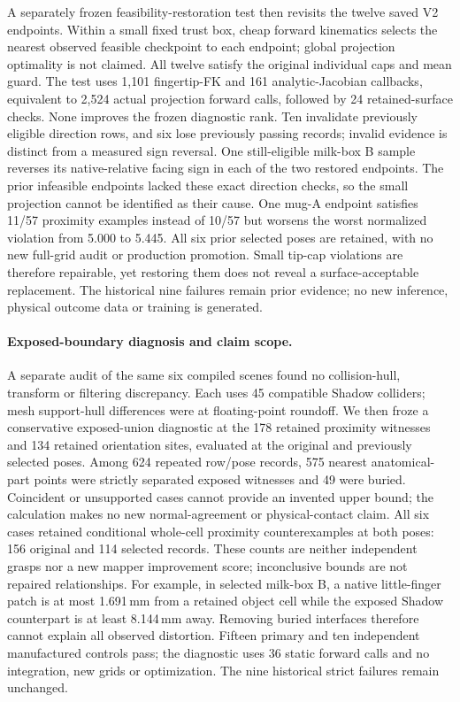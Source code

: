 \documentclass[10pt,letterpaper]{article}
\begin{document}
A separately frozen feasibility-restoration test then revisits the twelve saved
V2 endpoints. Within a small fixed trust box, cheap forward kinematics selects
the nearest observed feasible checkpoint to each endpoint; global projection
optimality is not claimed. All twelve satisfy the original individual caps
and mean guard. The test uses 1,101 fingertip-FK and 161 analytic-Jacobian
callbacks, equivalent to 2,524 actual projection forward calls, followed by
24 retained-surface checks. None improves the frozen diagnostic rank. Ten
invalidate previously eligible direction rows, and six lose previously
passing records; invalid evidence is distinct from a measured sign reversal.
One still-eligible milk-box B sample reverses its native-relative facing sign
in each of the two restored endpoints.
The prior infeasible endpoints lacked these exact direction checks, so the
small projection cannot be identified as their cause. One mug-A endpoint
satisfies 11/57 proximity examples instead of 10/57 but worsens the worst
normalized violation from 5.000 to 5.445. All six prior selected poses are
retained, with no new full-grid audit or production promotion. Small tip-cap
violations are therefore repairable, yet restoring them does not reveal a
surface-acceptable replacement. The historical nine failures remain prior
evidence; no new inference, physical outcome data or training is generated.
\paragraph{Exposed-boundary diagnosis and claim scope.}
A separate audit of the same six compiled scenes found no collision-hull,
transform or filtering discrepancy. Each uses 45 compatible Shadow colliders;
mesh support-hull differences were at floating-point roundoff. We then froze a
conservative exposed-union diagnostic at the 178 retained proximity witnesses
and 134 retained orientation sites, evaluated at the original and previously
selected poses. Among 624 repeated row/pose records, 575 nearest anatomical-part
points were strictly separated exposed witnesses and 49 were buried. Coincident
or unsupported cases cannot provide an invented upper bound; the calculation
makes no new normal-agreement or physical-contact claim. All six cases retained
conditional whole-cell proximity counterexamples at both poses: 156 original
and 114 selected records. These counts are neither independent grasps nor a new
mapper improvement score; inconclusive bounds are not repaired relationships.
For example, in selected milk-box B, a native little-finger patch is at most
1.691\,mm from a retained object cell while the exposed Shadow counterpart is
at least 8.144\,mm away. Removing buried interfaces therefore cannot explain all
observed distortion. Fifteen primary and ten independent manufactured controls
pass; the diagnostic uses 36 static forward calls and no integration, new grids
or optimization. The nine historical strict failures remain unchanged.
\end{document}
